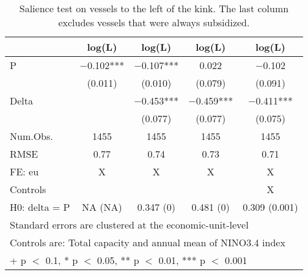 \begin{table}

\caption{\label{tab:}Salience test on vessels to the left of the kink.
             The last column excludes vessels that were always subsidized.}
\centering
\begin{tabular}[t]{lcccc}
\toprule
  & log(L) & log(L)  & log(L)   & log(L)   \\
\midrule
P & \num{-0.102}*** & \num{-0.107}*** & \num{0.022} & \num{-0.102}\\
 & (\num{0.011}) & (\num{0.010}) & (\num{0.079}) & (\num{0.091})\\
Delta &  & \num{-0.453}*** & \num{-0.459}*** & \num{-0.411}***\\
 &  & (\num{0.077}) & (\num{0.077}) & (\num{0.075})\\
\midrule
Num.Obs. & \num{1455} & \num{1455} & \num{1455} & \num{1455}\\
RMSE & \num{0.77} & \num{0.74} & \num{0.73} & \num{0.71}\\
FE: eu & X & X & X & X\\
Controls &  &  &  & X\\
H0: delta = P & NA (NA) & 0.347 (0) & 0.481 (0) & 0.309 (0.001)\\
\bottomrule
\multicolumn{5}{l}{\rule{0pt}{1em}Standard errors are clustered at the economic-unit-level}\\
\multicolumn{5}{l}{\rule{0pt}{1em}Controls are: Total capacity and annual mean of NINO3.4 index}\\
\multicolumn{5}{l}{\rule{0pt}{1em}+ p $<$ 0.1, * p $<$ 0.05, ** p $<$ 0.01, *** p $<$ 0.001}\\
\end{tabular}
\end{table}
